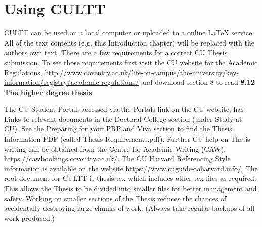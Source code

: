 \section{Using CULTT} %

CULTT can be used on a local computer or uploaded to a online \LaTeX{} service. All of the text contents (e.g. this Introduction chapter) will be replaced with the authors own text. There are a few requirements for a correct CU Thesis submission. To see those requirements first visit the CU website for the Academic Regulations, \url{http://www.coventry.ac.uk/life-on-campus/the-university/key-information/registry/academic-regulations/} and download section 8 to read \textbf{8.12 The higher degree thesis}. 

The CU Student Portal, accessed via the Portals link on the CU website, has Links to relevant documents in the Doctoral College section (under Study at CU). See the Preparing for your PRP and Viva  section to find the Thesis Information PDF (called Thesis Requirements.pdf). Further CU help on Thesis writing can be obtained from the Centre for Academic Writing (CAW), \url{https://cawbookings.coventry.ac.uk/}. The CU Harvard Referencing Style information is available on the website \url{https://www.cuguide-toharvard.info/}. The root document for CULTT is thesis.tex which includes other tex files as required. This allows the Thesis to be divided into smaller files for better management and safety. Working on smaller sections of the Thesis reduces the chances of accidentally destroying large chunks of work. (Always take regular backups of all work produced.)